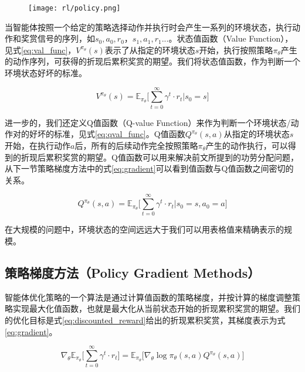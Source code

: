 \begin{figure}
  \centering
    \centering
    \texttt{[image: rl/policy.png]}
    \label{fig:policy}    
\end{figure}

当智能体按照一个给定的策略选择动作并执行时会产生一系列的环境状态，执行动作和奖赏信号的序列，如$s_0, a_0, r_0，s_1, a_1, r_1 ...$。状态值函数（Value Function），见式\ref{eq:val_func}，$V^{\pi_\theta}(s)$表示了从指定的环境状态$s$开始，执行按照策略$\pi_\theta$产生的动作序列，可获得的折现后累积奖赏的期望。我们将状态值函数，作为判断一个环境状态好坏的标准。

\begin{equation}
  \label{eq:val_func}
  	V^{\pi_\theta}(s)=\mathbb{E}_{\pi_\theta}\bigg[\sum_{t=0}^{\infty} {\gamma^{t}} \cdot r_{t}|s_0=s\bigg]
\end{equation}

进一步的，我们还定义Q值函数（Q-value Function）来作为判断一个环境状态/动作对的好坏的标准，见式\ref{eq:qval_func}。Q值函数$Q^{\pi_\theta}(s,a)$从指定的环境状态$s$开始，在执行动作$a$后，所有的后续动作完全按照策略$\pi_\theta$产生的动作执行，可以得到的折现后累积奖赏的期望。Q值函数可以用来解决前文所提到的功劳分配问题\cite{michalski2013machine}\cite{sutton1998reinforcement}，从下一节策略梯度方法中的式\ref{eq:gradient}可以看到值函数与Q值函数之间密切的关系。

\begin{equation}
  \label{eq:qval_func}
  	Q^{\pi_\theta}(s,a)=\mathbb{E}_{\pi_\theta}\bigg[\sum_{t=0}^{\infty} {\gamma^{t}} \cdot r_{t}|s_0=s, a_0=a\bigg]
\end{equation}

在大规模的问题中，环境状态的空间远远大于我们可以用表格值来精确表示的规模。

\subsection{策略梯度方法（Policy Gradient Methods）}

智能体优化策略的一个算法是通过计算值函数的策略梯度，并按计算的梯度调整策略实现最大化值函数，也就是最大化从当前状态开始的折现累积奖赏的期望。我们的优化目标是式\ref{eq:discounted_reward}给出的折现累积奖赏，其梯度表示为式\ref{eq:gradient}\cite{sutton1998reinforcement}。

\begin{equation}
  \label{eq:gradient}
  	\nabla_{\theta}\mathbb{E}_{\pi_\theta}\bigg[\sum_{t=0}^{\infty} {\gamma^{t}} \cdot r_{t}\bigg]= \mathbb{E}_{\pi_\theta}\big[\nabla_\theta\operatorname{log}\pi_\theta(s,a)Q^{\pi_\theta}(s,a) \big]
\end{equation}

